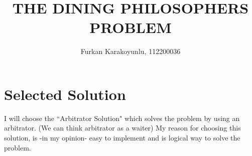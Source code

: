 \documentclass[12pt]{article}
\begin{document}
 \title{THE DINING PHILOSOPHERS PROBLEM}
 \author{Furkan Karakoyunlu, 112200036}
 \maketitle
 
 \section*{Selected Solution}
 \begin{flushleft}
  I will choose the ``Arbitrator Solution" which solves the problem by using an arbitrator. (We can think arbitrator as a waiter) My reason for choosing this solution, 
  is -in my opinion- easy to implement and is logical way to solve the problem.
 \end{flushleft}

 
\end{document}
